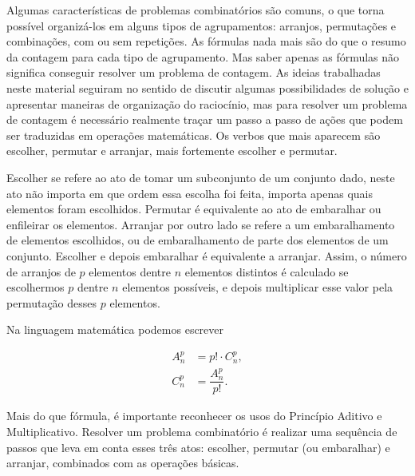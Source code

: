 Algumas características de problemas combinatórios são comuns, o que torna possível organizá-los em alguns tipos de agrupamentos: arranjos, permutações e combinações, com ou sem repetições. As fórmulas nada mais são do que o resumo da contagem para cada tipo de agrupamento. Mas saber apenas as fórmulas não significa conseguir resolver um problema de contagem. As ideias trabalhadas neste material seguiram no sentido de discutir algumas possibilidades de solução e apresentar maneiras de organização do raciocínio, mas para resolver um problema de contagem é necessário realmente traçar um passo a passo de ações que podem ser traduzidas em operações matemáticas.
Os verbos que mais aparecem são  escolher, permutar e arranjar, mais fortemente escolher e permutar. 

Escolher se refere ao ato de tomar um subconjunto de um conjunto dado, neste ato não importa em que ordem essa escolha foi feita, importa apenas quais elementos foram escolhidos. Permutar é equivalente ao ato de  embaralhar ou enfileirar os elementos. Arranjar por outro lado se refere a um embaralhamento de elementos escolhidos, ou de embaralhamento de parte dos elementos de um conjunto. Escolher e depois embaralhar é equivalente a arranjar. Assim, o número de arranjos de $p$ elementos dentre $n$ elementos distintos é calculado se escolhermos $p$ dentre $n$ elementos possíveis, e depois multiplicar esse valor pela permutação desses $p$ elementos. 

Na linguagem matemática podemos escrever

\begin{align*}
A_n^p&= p! \cdot C_n^p,\\
C_n^p&= \dfrac{A_n^p}{p!}.
\end{align*}

Mais do que fórmula, é importante reconhecer os usos do Princípio Aditivo e Multiplicativo. Resolver um problema combinatório é realizar uma sequência de passos que leva em conta esses três atos: escolher, permutar (ou embaralhar) e arranjar, combinados com as operações básicas.

